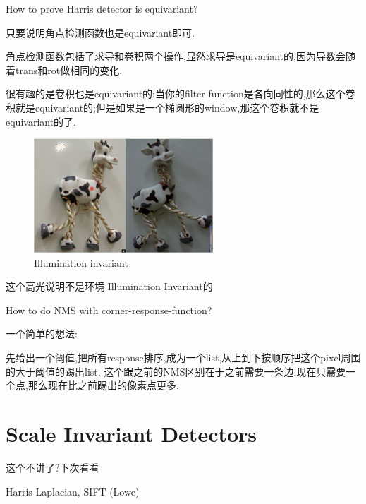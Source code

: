 \documentclass[lang=cn,10pt,green]{elegantbook}
\begin{document}
\begin{problem}
    How to prove Harris detector is equivariant?
\end{problem}


只要说明角点检测函数也是equivariant即可.

角点检测函数包括了求导和卷积两个操作,显然求导是equivariant的,因为导数会随着trans和rot做相同的变化.

很有趣的是卷积也是equivariant的:当你的filter function是各向同性的,那么这个卷积就是equivariant的;但是如果是一个椭圆形的window,那这个卷积就不是equivariant的了.

\begin{figure}[htbp]
    \centering
    \includegraphics[width=0.6\textwidth]{figures/light_invariant.png}
    \caption{Illumination invariant}
\end{figure}
\begin{remark}
    这个高光说明不是环境 Illumination Invariant的
\end{remark}


\begin{problem}
    How to do NMS with corner-response-function?
\end{problem}


一个简单的想法:

先给出一个阈值,把所有response排序,成为一个list,从上到下按顺序把这个pixel周围的大于阈值的踢出list.
这个跟之前的NMS区别在于之前需要一条边,现在只需要一个点,那么现在比之前踢出的像素点更多.

\section{Scale Invariant Detectors}

这个不讲了?下次看看

Harris-Laplacian, SIFT (Lowe)

\printbibliography[heading=bibintoc, title=\ebibname]
\end{document}
